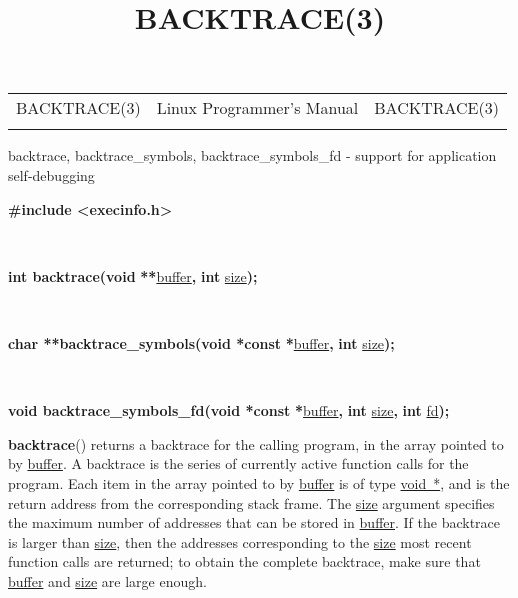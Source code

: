 \documentclass[]{article}
\title{BACKTRACE(3)}
\author{}
\date{}
\let\realtextbf=\textbf
\renewcommand{\textbf}[1]{\textcolor{boldcolor}{\realtextbf{#1}}}
\renewcommand{\emph}[1]{\underline{#1}}
\begin{document}
\maketitle

\begin{longtable}[c]{@{}lll@{}}
\toprule\addlinespace
BACKTRACE(3) & Linux Programmer's Manual & BACKTRACE(3)
\\\addlinespace
\bottomrule
\end{longtable}


backtrace, backtrace\_symbols, backtrace\_symbols\_fd - support for
application self-debugging


\textbf{\#include \textless{}execinfo.h\textgreater{}}

~

\textbf{int backtrace(void} \textbf{**}\emph{buffer}\textbf{,}
\textbf{int} \emph{size}\textbf{);}

~

\textbf{char **backtrace\_symbols(void *const}
\textbf{*}\emph{buffer}\textbf{,} \textbf{int} \emph{size}\textbf{);}

~

\textbf{void backtrace\_symbols\_fd(void *const}
\textbf{*}\emph{buffer}\textbf{,} \textbf{int} \emph{size}\textbf{,}
\textbf{int} \emph{fd}\textbf{);}


\textbf{backtrace}() returns a backtrace for the calling program, in the
array pointed to by \emph{buffer}. A backtrace is the series of
currently active function calls for the program. Each item in the array
pointed to by \emph{buffer} is of type \emph{void~*}, and is the return
address from the corresponding stack frame. The \emph{size} argument
specifies the maximum number of addresses that can be stored in
\emph{buffer}. If the backtrace is larger than \emph{size}, then the
addresses corresponding to the \emph{size} most recent function calls
are returned; to obtain the complete backtrace, make sure that
\emph{buffer} and \emph{size} are large enough.
\end{document}
